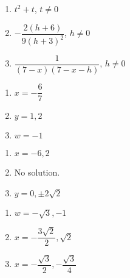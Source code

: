 \documentclass[11pt]{article}
\theoremstyle{definition}  %
\newcounter{HW}
\begin{document}
\begin{multicols}{3}
\begin{enumerate}
\setcounter{enumi}{\value{HW}}

\item $t^2+t$, $t \neq 0$  
\item $-\dfrac{2(h+6)}{9(h+3)^2}$, $h \neq 0$ 
\item $\dfrac{1}{(7-x)(7-x-h)}$, $h \neq 0$ 

\setcounter{HW}{\value{enumi}}
\end{enumerate}
\end{multicols}



\begin{multicols}{3}
\begin{enumerate}
\setcounter{enumi}{\value{HW}}

\item $x = -\dfrac{6}{7}$
\item $y = 1, 2$ 
\item $w = -1$ 

\setcounter{HW}{\value{enumi}}
\end{enumerate}
\end{multicols}

\begin{multicols}{3}
\begin{enumerate}
\setcounter{enumi}{\value{HW}}


\item $x=-6, 2$
\item No solution.
\item $y = 0, \pm 2\sqrt{2}$  

\setcounter{HW}{\value{enumi}}
\end{enumerate}
\end{multicols}

\begin{multicols}{3}
\begin{enumerate}
\setcounter{enumi}{\value{HW}}


\item $w = -\sqrt{3}, -1$
\item $x = -\dfrac{3\sqrt{2}}{2}, \sqrt{2}$
\item $x = -\dfrac{\sqrt{3}}{2}, -\dfrac{\sqrt{3}}{4}$

\setcounter{HW}{\value{enumi}}
\end{enumerate}
\end{multicols}
\end{document}
